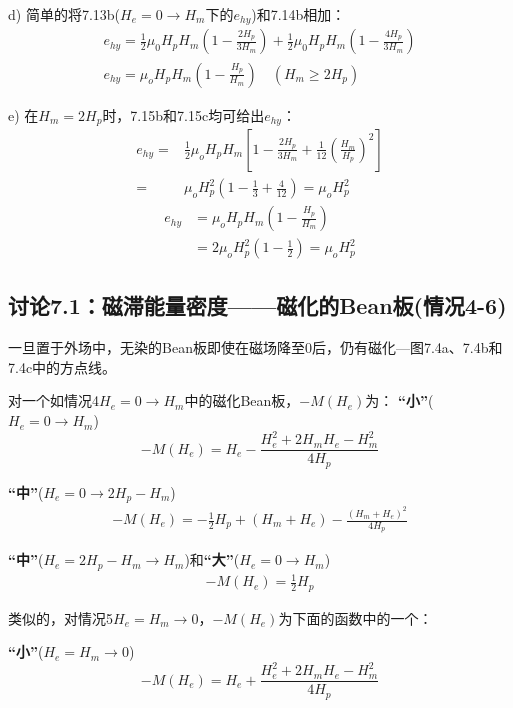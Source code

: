 d) 简单的将7.13b($H_e=0\rightarrow H_m$下的$e_{hy}$)和7.14b相加：
\begin{align*}%
e_{hy}=\frac{1}{2}\mu_0 H_p H_m\left(1-\frac{2H_p}{3H_m}\right)+\frac{1}{2}\mu_0 H_p H_m\left(1-\frac{4H_p}{3H_m}\right)\\
e_{hy}=\mu_oH_pH_m\left(1-\frac{H_p}{H_m}\right) \quad   (H_m\geq 2H_p) \tag{7.15c}
\end{align*}

e) 在$H_m=2H_p$时，7.15b和7.15c均可给出$e_{hy}$：
\begin{align*}%
e_{hy}=&\frac{1}{2}\mu_oH_pH_m\left[1-\frac{2H_p}{3H_m}+\frac{1}{12}\left(\frac{H_m}{H_p}\right)^2\right]\\\tag{7.15b}
=&\mu_oH_{p}^{2}\left(1-\frac{1}{3}+\frac{4}{12}\right)=\mu_oH_{p}^{2}
\end{align*}
\begin{align*}%
e_{hy}&=\mu_oH_pH_m\left(1-\frac{H_p}{H_m}\right) \\\tag{7.15c}
&=2\mu_oH_{p}^{2}\left(1-\frac{1}{2}\right)=\mu_oH_{p}^{2}
\end{align*}

\subsection{讨论7.1：磁滞能量密度——磁化的Bean板(情况4-6)}
一旦置于外场中，无染的Bean板即使在磁场降至0后，仍有磁化---图7.4a、7.4b和7.4c中的方点线。

对一个如情况4$H_e=0\rightarrow H_m$中的磁化Bean板，$-M(H_e)$为：
\textbf{“小”}($H_e=0\rightarrow H_m$)
\begin{equation}%
-M(H_e)=H_e-\frac{H_{e}^{2}+2H_mH_e-H_{m}^{2}}{4H_p}
\end{equation}

\textbf{“中”}($H_e=0\rightarrow 2H_p-H_m$)
\begin{align*}%
-M(H_e)=-\frac{1}{2}H_p+(H_m+H_e)-\frac{(H_m+H_e)^2}{4H_p} \tag{7.17b}
\end{align*}

\textbf{“中”}($H_e=2H_p-H_m\rightarrow H_m$)和\textbf{“大”}($H_e=0\rightarrow H_m$)
\begin{align*}%
-M(H_e)=\frac{1}{2}H_p \tag{5.6}
\end{align*}

类似的，对情况5$H_e=H_m\rightarrow 0$，$-M(H_e)$为下面的函数中的一个：

\textbf{“小”}($H_e=H_m\rightarrow 0$)
\begin{equation}%
-M(H_e)=H_e+\frac{H_{e}^{2}+2H_mH_e-H_{m}^{2}}{4H_p}
\end{equation}

